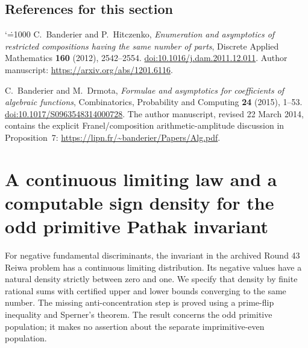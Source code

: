 \documentclass[11pt,a4paper]{article}
\makeatletter
\numberwithin{equation}{section}
\theoremstyle{definition}
\theoremstyle{remark}
\newenvironment{sectionabstract}{\par\smallskip\begingroup\small\noindent}{\par\endgroup\medskip}
\renewenvironment{thebibliography}[1]
 {\subsection*{References for this section}\small
  \list{\@biblabel{\@arabic\c@enumiv}}
       {\settowidth\labelwidth{\@biblabel{#1}}\leftmargin\labelwidth
        \advance\leftmargin\labelsep\@openbib@code
        \usecounter{enumiv}\let\p@enumiv\@empty
        \renewcommand\theenumiv{\@arabic\c@enumiv}}
  \sloppy\clubpenalty4000\widowpenalty4000\sfcode`\.=1000\relax}
 {\def\@noitemerr{\@latex@warning{Empty bibliography}}\endlist}
\makeatother
\begin{document}
\begin{thebibliography}{9}
C.~Banderier and P.~Hitczenko,
\emph{Enumeration and asymptotics of restricted compositions having the
same number of parts}, Discrete Applied Mathematics \textbf{160}
(2012), 2542--2554.
\href{https://doi.org/10.1016/j.dam.2011.12.011}{doi:10.1016/j.dam.2011.12.011}.
Author manuscript: \url{https://arxiv.org/abs/1201.6116}.

C.~Banderier and M.~Drmota,
\emph{Formulae and asymptotics for coefficients of algebraic functions},
Combinatorics, Probability and Computing \textbf{24} (2015), 1--53.
\href{https://doi.org/10.1017/S0963548314000728}{doi:10.1017/S0963548314000728}.
The author manuscript, revised 22 March 2014, contains the explicit
Franel/composition arithmetic-amplitude discussion in Proposition~7:
\url{https://lipn.fr/~banderier/Papers/Alg.pdf}.
\end{thebibliography}

\par\endgroup

\begingroup
\newcommand{\PP}{\mathbb P}
\newcommand{\EE}{\mathbb E}
\newcommand{\FF}{\mathcal F}
\clearpage
\section{\texorpdfstring{A continuous limiting law and a computable sign density for the odd primitive Pathak invariant}{A continuous limiting law and a computable sign density for the odd primitive Pathak invariant}}\label{section:add43reiwa}
\par\medskip


\begin{sectionabstract}
For negative fundamental discriminants, the invariant in the archived
Round 43 Reiwa problem has a continuous limiting distribution. Its
negative values have a natural density strictly between zero and one.
We specify that density by finite rational sums with certified upper
and lower bounds converging to the same number. The missing
anti-concentration step is proved using a prime-flip inequality and
Sperner's theorem. The result concerns the odd primitive population;
it makes no assertion about the separate imprimitive-even population.
\end{sectionabstract}
\end{document}
